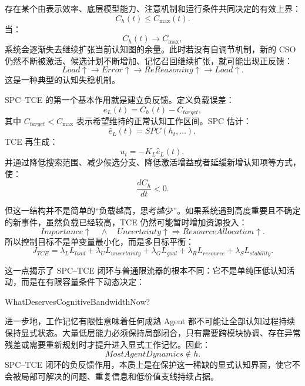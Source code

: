 存在某个由表示效率、底层模型能力、注意机制和运行条件共同决定的有效上界：
\begin{equation}
C_h(t)
\le
C_{\max}(t).
\end{equation}
当：
\begin{equation}
C_h(t)\rightarrow C_{\max},
\end{equation}
系统会逐渐失去继续扩张当前认知图的余量。此时若没有自调节机制，新的 CSO 仍然不断被激活、候选计划不断增加、记忆召回继续扩张，就可能出现正反馈：
\begin{equation}
Load\uparrow
\rightarrow
Error\uparrow
\rightarrow
ReReasoning\uparrow
\rightarrow
Load\uparrow.
\label{eq:cognitive-positive-feedback}
\end{equation}
这是一种典型的认知失稳机制。

SPC--TCE 的第一个基本作用就是建立负反馈。定义负载误差：
\begin{equation}
e_L(t)
=
C_h(t)-C_{target},
\end{equation}
其中 $C_{target}<C_{\max}$ 表示希望维持的正常认知工作区间。SPC 估计：
\begin{equation}
\hat e_L(t)
=
SPC(h_t,\ldots),
\end{equation}
TCE 再生成：
\begin{equation}
u_t
=
-K_L\hat e_L(t),
\end{equation}
并通过降低搜索范围、减少候选分支、降低激活增益或者延缓新增认知项等方式，使：
\begin{equation}
\frac{dC_h}{dt}<0.
\end{equation}

但这一结构并不是简单的``负载越高，思考越少''。如果系统遇到高度重要且不确定的新事件，虽然负载已经较高，TCE 仍然可能暂时增加资源投入：
\begin{equation}
Importance\uparrow
\quad\land\quad
Uncertainty\uparrow
\Rightarrow
ResourceAllocation\uparrow.
\end{equation}
所以控制目标不是单变量最小化，而是多目标平衡：
\begin{equation}
J_{TCE}
=
\lambda_L L_{load}
+
\lambda_U L_{uncertainty}
+
\lambda_G L_{goal}
+
\lambda_R L_{resource}
+
\lambda_S L_{stability}.
\end{equation}

这一点揭示了 SPC--TCE 闭环与普通限流器的根本不同：它不是单纯压低认知活动，而是在有限容量条件下动态决定：
\begin{statementbox}
WhatDeservesCognitiveBandwidthNow?
\end{statementbox}

进一步地，工作记忆有限性意味着任何成熟 Agent 都不可能让全部认知过程持续保持显式状态。大量低层能力必须保持局部闭合，只有需要跨模块协调、存在异常残差或需要重新规划时才提升进入显式工作记忆。因此：
\begin{equation}
MostAgentDynamics\notin h.
\end{equation}
SPC--TCE 闭环的负反馈作用，本质上是在保护这一稀缺的显式认知界面，使它不会被局部可解决的问题、重复信息和低价值支线持续占据。

